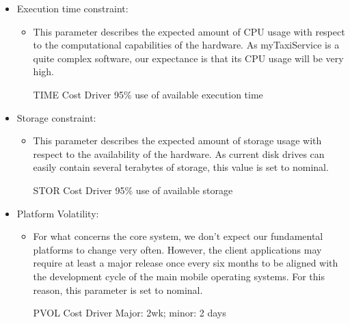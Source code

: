 \begin{itemize}
	\item Execution time constraint: 
	\begin{itemize}
	\item[] This parameter describes the expected amount of CPU usage with respect to the computational capabilities of the hardware. As myTaxiService is a quite complex software, our expectance is that its CPU usage will be very high.
	\begin{costdriverstable}{TIME Cost Driver}
		 {95\% use of available execution time}\hline
	\end{costdriverstable}
	\end{itemize}
\end{itemize}

\begin{itemize}
	\item Storage constraint: 
	\begin{itemize}
	\item[] This parameter describes the expected amount of storage usage with respect to the availability of the hardware. As current disk drives can easily contain several terabytes of storage, this value is set to nominal.
	\begin{costdriverstable}{STOR Cost Driver}
		 {95\% use of available storage}\hline
	\end{costdriverstable}
	\end{itemize}
\end{itemize}

\begin{itemize}
	\item Platform Volatility: 
	\begin{itemize}
	\item[] For what concerns the core system, we don't expect our fundamental platforms to change very often. However, the client applications may require at least a major release once every six months to be aligned with the development cycle of the main mobile operating systems. For this reason, this parameter is set to nominal.
	\begin{costdriverstable}{PVOL Cost Driver}
			{Major: 2wk; minor: 2 days}{}\hline
	\end{costdriverstable}
	\end{itemize}
\end{itemize}


